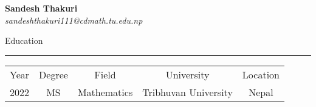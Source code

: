 \documentclass[11pt]{report}
\begin{document}
\begin{center}
  {\bfseries \large Sandesh Thakuri} \\[1mm]
  \textit{sandeshthakuri111@cdmath.tu.edu.np}
\end{center}
Education \\[-4mm]
\rule{\textwidth}{1pt}
\begin{table}[h]
  \centering
  \begin{tabular}{ccccc}
    Year& Degree& Field& University  & Location \\
    2022 & MS& Mathematics & Tribhuvan University & Nepal
  \end{tabular}
\end{table}
\end{document}
